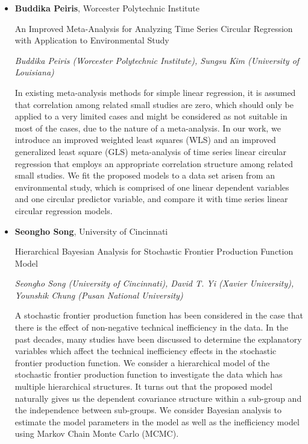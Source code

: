 \begin{itemize}
\item \textbf{Buddika Peiris}, Worcester Polytechnic Institute

An Improved Meta-Analysis for Analyzing Time Series Circular Regression with Application to Environmental Study

\emph{\footnotesize Buddika Peiris (Worcester Polytechnic Institute), Sungsu Kim (University of Louisiana)}

In existing meta-analysis methods for simple linear regression, it is assumed that correlation among related small studies are zero, which should only be applied to a very limited cases and might be considered as not suitable in most of the cases, due to the nature of a meta-analysis. In our work, we introduce an improved weighted least squares (WLS) and an improved generalized least square (GLS) meta-analysis of time series linear circular regression that employs an appropriate correlation structure among related small studies. We fit the proposed models to a data set arisen from an environmental study, which is comprised of one linear dependent variables and one circular predictor variable, and compare it with time series linear circular regression models.

\item \textbf{Seongho Song}, University of Cincinnati

Hierarchical Bayesian Analysis for Stochastic Frontier Production Function Model

\emph{\footnotesize Seongho Song (University of Cincinnati), David T. Yi (Xavier University), Younshik Chung (Pusan National University)}

A stochastic frontier production function has been considered in the case that there is the effect of non-negative technical inefficiency in the data. In the past decades, many studies have been discussed to determine the explanatory variables which affect the technical inefficiency effects in the stochastic frontier production function. We consider a hierarchical model of the stochastic frontier production function to investigate the data which has multiple hierarchical structures. It turns out that the proposed model naturally gives us the dependent covariance structure within a sub-group and the independence between sub-groups. We consider Bayesian analysis to estimate the model parameters in the model as well as the inefficiency model using Markov Chain Monte Carlo (MCMC).

\end{itemize}

